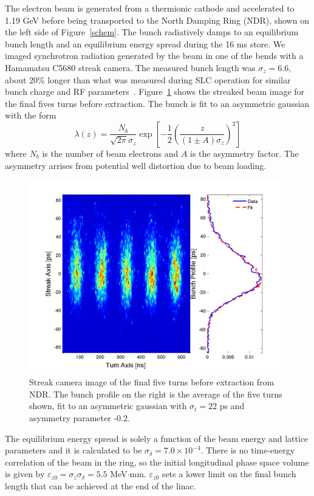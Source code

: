 \documentclass[%
twocolumn,
showpacs,preprintnumbers,
 aps,
prstab,
]{revtex4-1}
\begin{document}
The electron beam is generated from a thermionic cathode and accelerated to 1.19 GeV before being transported to the North Damping Ring (NDR), shown on the left side of Figure~\ref{schem}. The bunch radiatively damps to an equilibrium bunch length and an equilibrium energy spread during the 16 ms store. We imaged synchrotron radiation generated by the beam in one of the bends with a Hamamatsu C5680 streak camera. The measured bunch length was $\sigma_z = 6.6$, about 20\% longer than what was measured during SLC operation for similar bunch charge and RF parameters~\cite{Holtzapple}. Figure~\ref{streak} shows the streaked beam image for the final fives turns before extraction. The bunch is fit to an asymmetric gaussian with the form
\begin{equation}
 \lambda(z) = \frac{N_b}{\sqrt{2\pi}\sigma_z}\exp{ \left[-\frac{1}{2}\left(\frac{z}{(1\pm A)\sigma_z}\right)^2\right]}
\end{equation}
where $N_b$ is the number of beam electrons and $A$ is the asymmetry factor. The asymmetry arrises from potential well distortion due to beam loading.

\begin{figure}[htb]
  \includegraphics[width=\columnwidth]{figures/combo.pdf}
  \caption{Streak camera image of the final five turns before extraction from NDR. The bunch profile on the right is the average of the five turns shown, fit to an asymmetric gaussian with $\sigma_t = 22$ ps and asymmetry parameter -0.2.}
  \label{streak}
\end{figure}

The equilibrium energy spread is solely a function of the beam energy and lattice parameters and it is calculated to be $\sigma_{\delta} = 7.0 \times 10^{-4}$. There is no time-energy correlation of the beam in the ring, so the initial longitudinal phase space volume is given by $\varepsilon_{z0} = \sigma_z \sigma_{\delta} = 5.5$ MeV$\cdot$mm. $\varepsilon_{z0}$ sets a lower limit on the final bunch length that can be achieved at the end of the linac.
\end{document}
